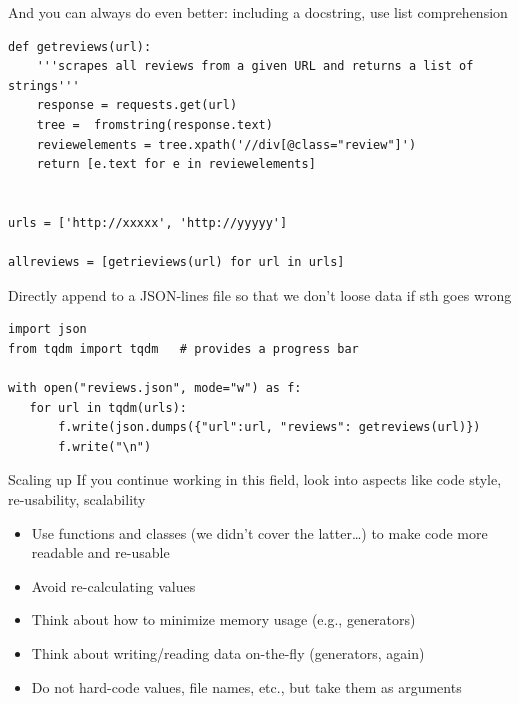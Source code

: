 \begin{frame}
And you can always do even better: including a docstring, use list comprehension
\begin{verbatim}
def getreviews(url):
    '''scrapes all reviews from a given URL and returns a list of strings'''
    response = requests.get(url)
    tree =  fromstring(response.text)
    reviewelements = tree.xpath('//div[@class="review"]')
    return [e.text for e in reviewelements]


urls = ['http://xxxxx', 'http://yyyyy']

allreviews = [getrieviews(url) for url in urls]
\end{verbatim}
\end{frame}





\begin{frame}
Directly append to a JSON-lines file so that we don't loose data if sth goes wrong
\begin{verbatim}
import json
from tqdm import tqdm   # provides a progress bar

with open("reviews.json", mode="w") as f:
   for url in tqdm(urls):
       f.write(json.dumps({"url":url, "reviews": getreviews(url)})
       f.write("\n")
\end{verbatim}
\end{frame}




\begin{frame}{Scaling up}
	If you continue working in this field, look into aspects like code style, re-usability, scalability
	\begin{itemize}
		\item Use functions and classes (we didn't cover the latter\ldots) to make code more readable and re-usable
		\item Avoid re-calculating values
		\item Think about how to minimize memory usage (e.g., generators)
		\item Think about writing/reading data on-the-fly (generators, again)
		\item Do not hard-code values, file names, etc., but take them as arguments
	\end{itemize}	
\end{frame}




